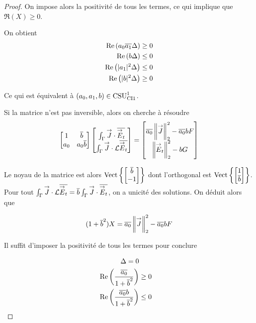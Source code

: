 \begin{proof}
        On impose alors la positivité de tous les termes, ce qui implique que \(\Re(X)\ge0\).

        On obtient
        \begin{align}
          \Re\left(a_0\conj{a_1}\Delta\right) &\ge 0
          \\
          \Re\left(b\Delta\right) &\le 0
          \\
          \Re\left(|a_1|^2\Delta\right) &\le 0
          \\
          \Re\left(|b|^2\Delta\right) &\ge 0
        \end{align}

        Ce qui est équivalent à \((a_0,a_1,b) \in \CSU[1]{CI1}\).

        Si la matrice n'est pas inversible, alors on cherche à résoudre
        \[
          \begin{bmatrix}
            1 & \conj{b} \\
            a_0 & a_0\conj{b}
          \end{bmatrix}
          \begin{bmatrix}
            \int_\Gamma \vJ \cdot \conj{\vE_t} \\
            \int_\Gamma \vJ \cdot \LL\conj{\vE_t}
          \end{bmatrix}
          =
          \begin{bmatrix}
            \conj{a_0}\norm{\vJ}_2^2 - \conj{a_0}bF
            \\
            \norm{\vE_t}_2^2 - bG
          \end{bmatrix}
        \]

        Le noyau de la matrice est alors \(\Vect{\begin{bmatrix}\conj{b}\\-1\end{bmatrix}}\) dont l'orthogonal est  \(\Vect{\begin{bmatrix}1\\\conj{b}\end{bmatrix}}\).
        Pour tout \(\int_\Gamma \vJ\cdot \LL\conj{\vE_t} = \conj{b} \int_\Gamma \vJ \cdot \conj{\vE_t} \), on a unicité des solutions. On déduit alors que

        \[
          (1 + \conj{b}^2) X = \conj{a_0} \norm{\vJ}_2^2 - \conj{a_0}bF
        \]

        Il suffit d'imposer la positivité de tous les termes pour conclure

        \begin{align}
          \Delta = 0 \\
          \Re\left(\frac{\conj{a_0}}{1 + \conj{b}^2}\right) &\ge 0 \\
          \Re\left(\frac{\conj{a_0}b}{1 + \conj{b}^2}\right) &\le 0
        \end{align}

      \end{proof}

